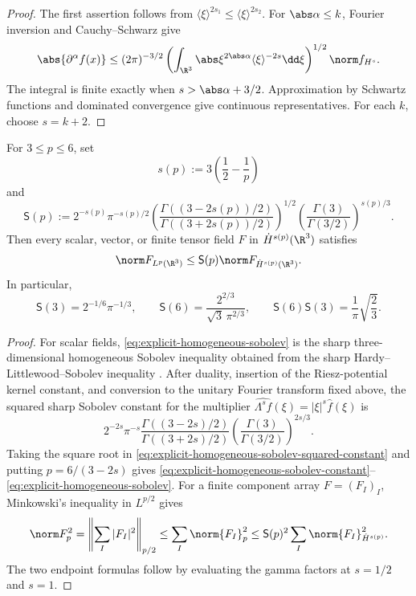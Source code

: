 \begin{proof}
The first assertion follows from
\(\langle\xi\rangle^{2s_1}\le\langle\xi\rangle^{2s_2}\).
For \(\abs\alpha\le k\), Fourier inversion and Cauchy--Schwarz give
\[
 \abs{\partial^\alpha f(x)}
 \le(2\pi)^{-3/2}
 \left(\int_{\R^3}\abs\xi^{2\abs\alpha}
 \langle\xi\rangle^{-2s}\dd\xi\right)^{1/2}
 \norm f_{H^s}.
\]
The integral is finite exactly when \(s>\abs\alpha+3/2\).
Approximation by Schwartz functions and dominated convergence give continuous
representatives.  For each \(k\), choose \(s=k+2\).
\end{proof}

\begin{lemma}
\label{lem:explicit-homogeneous-sobolev}
For \(3\le p\le6\), set
\[
 s(p):=3\left(\frac12-\frac1p\right)
\]
and
\begin{equation}
 \mathsf S(p):=
 2^{-s(p)}\pi^{-s(p)/2}
 \left(
  \frac{\Gamma((3-2s(p))/2)}
       {\Gamma((3+2s(p))/2)}
 \right)^{1/2}
 \left(\frac{\Gamma(3)}{\Gamma(3/2)}\right)^{s(p)/3}.
 \label{eq:explicit-homogeneous-sobolev-constant}
\end{equation}
Then every scalar, vector, or finite tensor field \(F\) in
\(\dot H^{s(p)}(\R^3)\) satisfies
\begin{equation}
 \norm F_{L^p(\R^3)}
 \le \mathsf S(p)\norm F_{\dot H^{s(p)}(\R^3)}.
 \label{eq:explicit-homogeneous-sobolev}
\end{equation}
In particular,
\[
 \mathsf S(3)=2^{-1/6}\pi^{-1/3},
 \qquad
 \mathsf S(6)=\frac{2^{2/3}}{\sqrt3\,\pi^{2/3}},
 \qquad
 \mathsf S(6)\mathsf S(3)=\frac1\pi\sqrt{\frac23}.
\]
\end{lemma}

\begin{proof}
For scalar fields, \eqref{eq:explicit-homogeneous-sobolev} is the sharp
three-dimensional homogeneous Sobolev inequality obtained from the sharp
Hardy--Littlewood--Sobolev inequality \cite{Lieb1983}.  After duality,
insertion of the Riesz-potential kernel constant, and conversion to the
unitary Fourier transform fixed above, the squared sharp Sobolev constant for
the multiplier
\(\widehat{\Lambda^sf}(\xi)=|\xi|^s\widehat f(\xi)\) is
\begin{equation}
 2^{-2s}\pi^{-s}
 \frac{\Gamma((3-2s)/2)}{\Gamma((3+2s)/2)}
 \left(\frac{\Gamma(3)}{\Gamma(3/2)}\right)^{2s/3}.
 \label{eq:explicit-homogeneous-sobolev-squared-constant}
\end{equation}
Taking the square root in
\eqref{eq:explicit-homogeneous-sobolev-squared-constant} and putting
\(p=6/(3-2s)\) gives
\eqref{eq:explicit-homogeneous-sobolev-constant}--
\eqref{eq:explicit-homogeneous-sobolev}.  For a finite component array
\(F=(F_I)_I\), Minkowski's inequality in \(L^{p/2}\) gives
\[
 \norm F_p^2
 =\left\|\sum_I|F_I|^2\right\|_{p/2}
 \le\sum_I\norm{F_I}_p^2
 \le\mathsf S(p)^2\sum_I\norm{F_I}_{\dot H^{s(p)}}^2.
\]
The two endpoint formulas follow by evaluating the gamma factors at
\(s=1/2\) and \(s=1\).
\end{proof}

